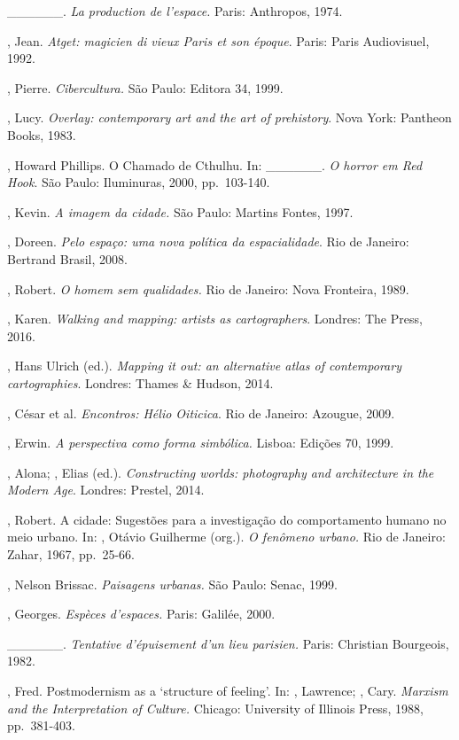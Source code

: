 \begin{Parskip}
\_\_\_\_\_\_. \emph{La production de l'espace.} Paris: Anthropos, 1974.

, Jean. \emph{Atget: magicien di vieux Paris et son époque}.
Paris: Paris Audiovisuel, 1992.

, Pierre. \emph{Cibercultura.} São Paulo: Editora 34, 1999.

, Lucy. \emph{Overlay: contemporary art and the art of
prehistory}. Nova York: Pantheon Books, 1983.

, Howard Phillips. O Chamado de Cthulhu. In: \_\_\_\_\_\_. \emph{O horror em Red Hook}. São Paulo: Iluminuras, 2000, pp.~103-140.

, Kevin. \emph{A imagem da cidade.} São Paulo: Martins Fontes,
1997.

, Doreen. \emph{Pelo espaço: uma nova política da
espacialidade}. Rio de Janeiro: Bertrand Brasil, 2008.

, Robert. \emph{O homem sem qualidades.} Rio de Janeiro: Nova
Fronteira, 1989.

, Karen. \emph{Walking and mapping: artists as cartographers}.
Londres: The  Press, 2016.

, Hans Ulrich (ed.). \emph{Mapping it out: an alternative atlas
of contemporary cartographies}. Londres: Thames \& Hudson, 2014.

, César et al. \emph{Encontros: Hélio Oiticica}. Rio de
Janeiro: Azougue, 2009.

, Erwin. \emph{A perspectiva como forma simbólica.} Lisboa:
Edições 70, 1999.

, Alona; , Elias (ed.). \emph{Constructing worlds:
photography and architecture in the Modern Age}. Londres: Prestel, 2014.

, Robert. A cidade: Sugestões para a investigação do comportamento
humano no meio urbano. In: , Otávio Guilherme (org.). \emph{O
fenômeno urbano.} Rio de Janeiro: Zahar, 1967, pp.~25-66.

, Nelson Brissac. \emph{Paisagens urbanas.} São Paulo: Senac, 1999.

, Georges. \emph{Espèces d'espaces.} Paris: Galilée, 2000.

\_\_\_\_\_\_. \emph{Tentative d'épuisement d'un lieu parisien.}
Paris: Christian Bourgeois, 1982.

, Fred. Postmodernism as a `structure of feeling'. In: ,
Lawrence; , Cary. \emph{Marxism and the Interpretation of
Culture.} Chicago: University of Illinois Press, 1988, pp.~381-403.


\end{Parskip}
